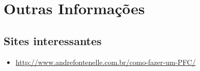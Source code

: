 \chapter{Outras Informações}

\section{Sites interessantes}
\begin{itemize}
    \item \url{http://www.andrefontenelle.com.br/como-fazer-um-PFC/}
\end{itemize}

